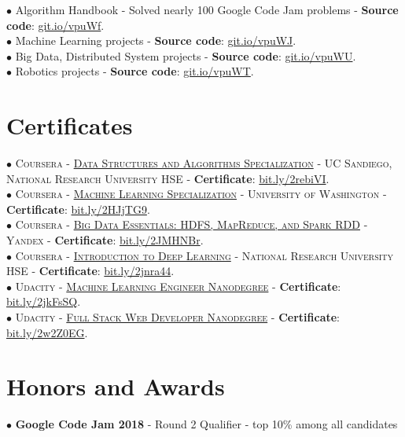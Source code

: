 \documentclass[10pt]{article}
\begin{document}
        $\bullet$ {Algorithm Handbook - Solved nearly 100 Google Code Jam problems - \textbf{Source code}: \href{https://git.io/vpuWf}{git.io/vpuWf}.} \\
        $\bullet$ {Machine Learning projects  - \textbf{Source code}: \href{https://git.io/vpuWJ}{git.io/vpuWJ}.} \\
        $\bullet$ {Big Data, Distributed System projects - \textbf{Source code}: \href{https://git.io/vpuWU}{git.io/vpuWU}.} \\
        $\bullet$ {Robotics projects - \textbf{Source code}: \href{https://git.io/vpuWT}{git.io/vpuWT}.}


    \section{Certificates}

    \vspace{-2mm}

    $\bullet$ \textsc{Coursera - \href{https://www.coursera.org/account/accomplishments/specialization/certificate/AKFYZQ9QD8XH}{Data Structures and Algorithms Specialization} - UC Sandiego, National Research University HSE} - \textbf{Certificate}: \href{https://bit.ly/2rebiVI}{bit.ly/2rebiVI}. \\
    $\bullet$ \textsc{Coursera - \href{https://www.coursera.org/account/accomplishments/specialization/certificate/ZUGAFYKCMQ79}{Machine Learning Specialization} - University of Washington} - \textbf{Certificate}: \href{https://bit.ly/2HJjTG9}{bit.ly/2HJjTG9}.\\
    $\bullet$ \textsc{Coursera - \href{https://www.coursera.org/account/accomplishments/certificate/G25TQPPNXGW5}{Big Data Essentials: HDFS, MapReduce, and Spark RDD} - Yandex} - \textbf{Certificate}: \href{https://bit.ly/2JMHNBr}{bit.ly/2JMHNBr}. \\
    $\bullet$ \textsc{Coursera - \href{https://www.coursera.org/account/accomplishments/certificate/XN2B7T4AJX8C}{Introduction to Deep Learning} - National Research University HSE} - \textbf{Certificate}: \href{https://bit.ly/2jnra44}{bit.ly/2jnra44}. \\
    $\bullet$ \textsc{Udacity - \href{https://graduation.udacity.com/confirm/HK9JLR3N}{Machine Learning Engineer Nanodegree}} - \textbf{Certificate}: \href{https://bit.ly/2jkFsSQ}{bit.ly/2jkFsSQ}. \\
    $\bullet$ \textsc{Udacity - \href{https://graduation.udacity.com/confirm/KPSCQGZK}{Full Stack Web Developer Nanodegree}} - \textbf{Certificate}: \href{https://bit.ly/2w2Z0EG}{bit.ly/2w2Z0EG}.

    \section{Honors and Awards}

    \vspace{-2mm}

        $\bullet$ \textbf{Google Code Jam 2018} - Round 2 Qualifier - top 10\% among all candidates
\end{document}
